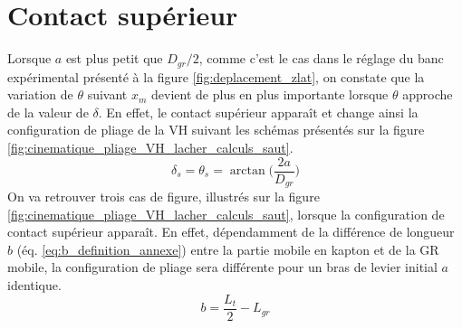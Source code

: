 \section{Contact supérieur}
\label{subsubsec:4.3.2.b_Apres saut}
\begin{table}[!htbp]
   \centering
     \caption{Définition des paramètres géométriques d'entrée et de sortie du système d'équation $S_{sup}$(\ref{eq:S_ap}) après saut}
     \label{tab:parametres_apres_saut}
\end{table} 
Lorsque $a$ est plus petit que $D_{gr}/2$, comme c'est le cas dans le réglage du banc expérimental présenté à la figure \ref{fig:deplacement_zlat}, on constate que la variation de $\theta$ suivant $x_m$ devient de plus en plus importante lorsque $\theta$ approche de la valeur de $\delta$. En effet, le contact supérieur apparaît et change ainsi la configuration de pliage de la VH suivant les schémas présentés sur la figure \ref{fig:cinematique_pliage_VH_lacher_calculs_saut}. 
\begin{equation}
\delta_s = \theta_s = \arctan\biggl(\dfrac{2a}{D_{gr}}\biggr)
\label{eq:delta_s} 
\end{equation}
On va retrouver trois cas de figure, illustrés sur la figure  \ref{fig:cinematique_pliage_VH_lacher_calculs_saut}, lorsque la configuration de contact supérieur apparaît. En effet, dépendamment de la différence de longueur $b$ (éq. \ref{eq:b_definition_annexe}) entre la partie mobile en kapton et de la GR mobile, la configuration de pliage sera différente pour un bras de levier initial $a$ identique. 
\begin{equation}
	b = \dfrac{L_t}{2} - L_{gr}
	\label{eq:b_definition_annexe}
\end{equation}


